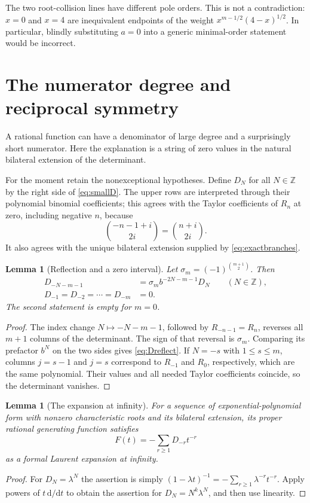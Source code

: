 \documentclass[11pt,a4paper]{article}
\numberwithin{equation}{section}
\newtheorem{lemma}[theorem]{Lemma}
\theoremstyle{definition}
\theoremstyle{remark}
\newcommand{\ZZ}{\mathbb Z}
\newcommand{\dd}{\mathrm d}
\begin{document}
The two root-collision lines have different pole orders.  This is
not a contradiction: $x=0$ and $x=4$ are inequivalent endpoints of the
weight $x^{m-1/2}(4-x)^{1/2}$.  In particular, blindly substituting
$a=0$ into a generic minimal-order statement would be incorrect.

\section{The numerator degree and reciprocal symmetry}\label{sec:numerator}

A rational function can have a denominator of large degree and a
surprisingly short numerator.  Here the explanation is a string of
zero values in the natural bilateral extension of the determinant.

For the moment retain the nonexceptional hypotheses.  Define $D_N$ for
all $N\in\ZZ$ by the right side of \eqref{eq:smallD}.  The upper rows
are interpreted through their polynomial binomial coefficients; this
agrees with the Taylor coefficients of $R_n$ at zero, including
negative $n$, because
\[
 \binom{-n-1+i}{2i}=\binom{n+i}{2i}.
\]
It also agrees with the unique bilateral extension supplied by
\eqref{eq:exactbranches}.

\begin{lemma}[Reflection and a zero interval]\label{lem:bilateral}
Let $\sigma_m=(-1)^{\binom{m+1}{2}}$.  Then
\begin{align}
 D_{-N-m-1}&=\sigma_m b^{-2N-m-1}D_N\qquad(N\in\ZZ),
       \label{eq:Dreflect}\\
 D_{-1}=D_{-2}=\cdots=D_{-m}&=0.
       \label{eq:Dzeros}
\end{align}
The second statement is empty for $m=0$.
\end{lemma}
\begin{proof}
The index change $N\mapsto-N-m-1$, followed by
$R_{-n-1}=R_n$, reverses all $m+1$ columns of the determinant.
The sign of that reversal is $\sigma_m$.  Comparing its prefactor
$b^N$ on the two sides gives \eqref{eq:Dreflect}.
If $N=-s$ with $1\leq s\leq m$, columns $j=s-1$ and $j=s$ correspond
to $R_{-1}$ and $R_0$, respectively, which are the same polynomial.
Their values and all needed Taylor coefficients coincide, so the
determinant vanishes.
\end{proof}

\begin{lemma}[The expansion at infinity]\label{lem:infinity}
For a sequence of exponential-polynomial form with nonzero characteristic
roots and its bilateral extension, its proper rational generating
function satisfies
\begin{equation}\label{eq:infinity}
 F(t)=-\sum_{r\geq1}D_{-r}t^{-r}
\end{equation}
as a formal Laurent expansion at infinity.
\end{lemma}
\begin{proof}
For $D_N=\lambda^N$ the assertion is simply
$(1-\lambda t)^{-1}=-\sum_{r\geq1}\lambda^{-r}t^{-r}$.
Apply powers of $t\,\dd/\dd t$ to obtain the assertion for
$D_N=N^k\lambda^N$, and then use linearity.
\end{proof}
\end{document}
